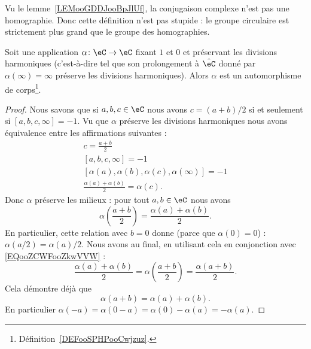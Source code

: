 Vu le lemme~\ref{LEMooGDDJooBpJlUf}, la conjugaison complexe n'est pas une homographie. Donc cette définition n'est pas stupide : le groupe circulaire est strictement plus grand que le groupe des homographies.

\begin{lemma}       \label{LEMooOPOMooWZLSeH}
	Soit une application \( \alpha\colon \eC\to \eC\) fixant \( 1\) et \( 0\) et préservant les divisions harmoniques (c'est-à-dire tel que son prolongement à \( \hat\eC\) donné par \( \alpha(\infty)=\infty\) préserve les divisions harmoniques). Alors \( \alpha\) est un automorphisme de corps\footnote{Définition~\ref{DEFooSPHPooCwjzuz}.}.
\end{lemma}

\begin{proof}
	Nous savons que si \( a,b,c\in \eC\) nous avons \( c=(a+b)/2\) si et seulement si \( [a,b,c,\infty]=-1\). Vu que \( \alpha\) préserve les divisions harmoniques nous avons équivalence entre les affirmations suivantes :
	\begin{subequations}
		\begin{align}
			c=\frac{ a+b }{ 2 }                               \\
			[a,b,c,\infty]=-1                                 \\
			[\alpha(a),\alpha(b),\alpha(c),\alpha(\infty)]=-1 \\
			\frac{ \alpha(a)+\alpha(b) }{2}=\alpha(c).
		\end{align}
	\end{subequations}
	Donc \( \alpha\) préserve les milieux : pour tout \( a,b\in \eC\) nous avons
	\begin{equation}        \label{EQooZCWFooZkwVVW}
		\alpha\left( \frac{ a+b }{2} \right)=\frac{ \alpha(a)+\alpha(b) }{2}.
	\end{equation}
	En particulier, cette relation avec \( b=0\) donne (parce que \( \alpha(0)=0\)) : \( \alpha(a/2)=\alpha(a)/2\). Nous avons au final, en utilisant cela en conjonction avec \eqref{EQooZCWFooZkwVVW} :
	\begin{equation}
		\frac{ \alpha(a)+\alpha(b) }{2}=\alpha\left( \frac{ a+b }{2} \right)=\frac{ \alpha(a+b) }{ 2 }.
	\end{equation}
	Cela démontre déjà que
	\begin{equation}
		\alpha(a+b)=\alpha(a)+\alpha(b).
	\end{equation}
	En particulier \( \alpha(-a)=\alpha(0-a)=\alpha(0)-\alpha(a)=-\alpha(a)\).


\end{proof}

